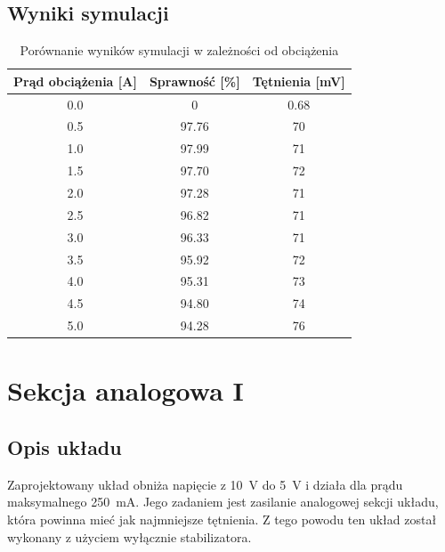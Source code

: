 \documentclass{article}
\begin{document}
\subsection{Wyniki symulacji}
\begin{table}[H]
    \centering
    \caption{Porównanie wyników symulacji w zależności od obciążenia}
    \label{tab:efficiency_ripple}
    \begin{tabular}{ccc}
        \toprule
        \textbf{Prąd obciążenia [A]} & \textbf{Sprawność [\%]} & \textbf{Tętnienia [mV]} \\
        \midrule
        0.0                          & 0                       & 0.68                    \\
        0.5                          & 97.76                   & 70                      \\
        1.0                          & 97.99                   & 71                      \\
        1.5                          & 97.70                   & 72                      \\
        2.0                          & 97.28                   & 71                      \\
        2.5                          & 96.82                   & 71                      \\
        3.0                          & 96.33                   & 71                      \\
        3.5                          & 95.92                   & 72                      \\
        4.0                          & 95.31                   & 73                      \\
        4.5                          & 94.80                   & 74                      \\
        5.0                          & 94.28                   & 76                      \\
        \bottomrule
    \end{tabular}
\end{table}


\section{Sekcja analogowa I}
\subsection{Opis układu}
Zaprojektowany układ obniża napięcie z \SI{10}{\V} do \SI{5}{\V} i działa dla prądu maksymalnego \SI{250}{\milli\A}. Jego zadaniem jest zasilanie analogowej sekcji układu, która powinna mieć jak najmniejsze tętnienia. Z tego powodu ten układ został wykonany z użyciem wyłącznie stabilizatora.
\end{document}
